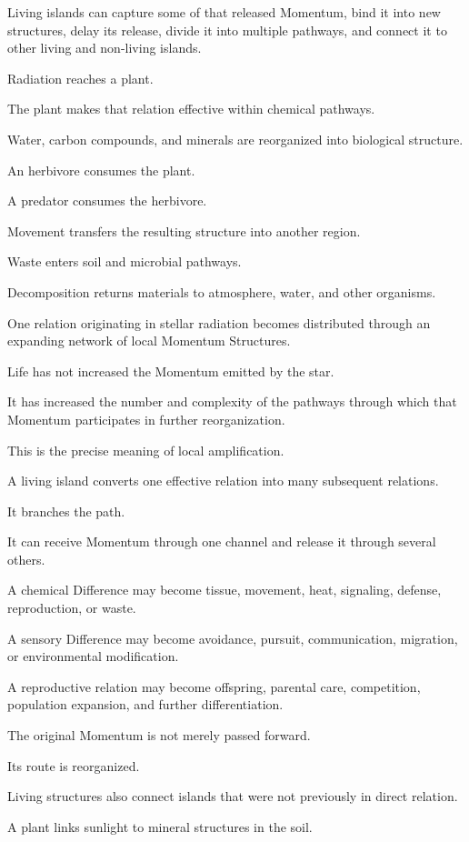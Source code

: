 Living islands can capture some of that released Momentum, bind it into new structures, delay its release, divide it into multiple pathways, and connect it to other living and non-living islands.

Radiation reaches a plant.

The plant makes that relation effective within chemical pathways.

Water, carbon compounds, and minerals are reorganized into biological structure.

An herbivore consumes the plant.

A predator consumes the herbivore.

Movement transfers the resulting structure into another region.

Waste enters soil and microbial pathways.

Decomposition returns materials to atmosphere, water, and other organisms.

One relation originating in stellar radiation becomes distributed through an expanding network of local Momentum Structures.

Life has not increased the Momentum emitted by the star.

It has increased the number and complexity of the pathways through which that Momentum participates in further reorganization.

This is the precise meaning of local amplification.

A living island converts one effective relation into many subsequent relations.

It branches the path.

It can receive Momentum through one channel and release it through several others.

A chemical Difference may become tissue, movement, heat, signaling, defense, reproduction, or waste.

A sensory Difference may become avoidance, pursuit, communication, migration, or environmental modification.

A reproductive relation may become offspring, parental care, competition, population expansion, and further differentiation.

The original Momentum is not merely passed forward.

Its route is reorganized.

Living structures also connect islands that were not previously in direct relation.

A plant links sunlight to mineral structures in the soil.


